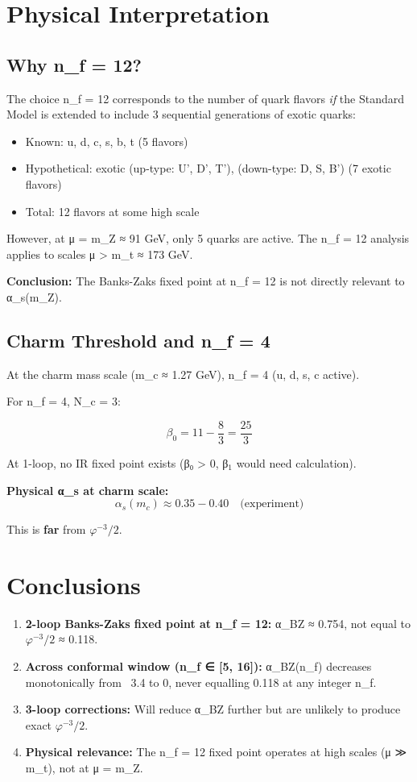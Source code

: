 \documentclass{article}
\begin{document}
\section{Physical Interpretation}

\subsection{Why n_f = 12?}

The choice n_f = 12 corresponds to the number of quark flavors \textit{if} the Standard Model is extended to include 3 sequential generations of exotic quarks:

\begin{itemize}
\item Known: u, d, c, s, b, t (5 flavors)
\item Hypothetical: exotic (up-type: U', D', T'), (down-type: D, S, B') (7 exotic flavors)
\item Total: 12 flavors at some high scale
\end{itemize}

However, at μ = m_Z ≈ 91 GeV, only 5 quarks are active. The n_f = 12 analysis applies to scales μ > m_t ≈ 173 GeV.

\textbf{Conclusion:} The Banks-Zaks fixed point at n_f = 12 is not directly relevant to α_s(m_Z).

\subsection{Charm Threshold and n_f = 4}

At the charm mass scale (m_c ≈ 1.27 GeV), n_f = 4 (u, d, s, c active).

For n_f = 4, N_c = 3:

\[
\beta_0 = 11 - \frac{8}{3} = \frac{25}{3}
\]

At 1-loop, no IR fixed point exists (β₀ > 0, β$_1$ would need calculation).

\textbf{Physical α_s at charm scale:}
\[
\alpha_s(m_c) \approx 0.35 - 0.40 \quad \text{(experiment)}
\]

This is \textbf{far} from $\varphi^{-3}/2$.

\section{Conclusions}

\begin{enumerate}
\item \textbf{2-loop Banks-Zaks fixed point at n_f = 12:} α_BZ ≈ 0.754, not equal to $\varphi^{-3}/2$ ≈ 0.118.
\item \textbf{Across conformal window (n_f ∈ [5, 16]):} α_BZ(n_f) decreases monotonically from ~3.4 to 0, never equalling 0.118 at any integer n_f.
\item \textbf{3-loop corrections:} Will reduce α_BZ further but are unlikely to produce exact $\varphi^{-3}/2$.
\item \textbf{Physical relevance:} The n_f = 12 fixed point operates at high scales (μ ≫ m_t), not at μ = m_Z.
\end{enumerate}
\end{document}
